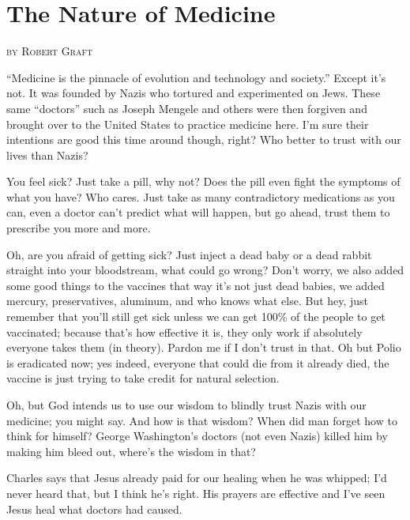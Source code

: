\section{The Nature of Medicine}
\begin{flushright}
\textsc{
by Robert Graft}
\end{flushright}

``Medicine is the pinnacle of evolution and technology and society.'' Except it's not. It was founded by Nazis who tortured and experimented on Jews. These same ``doctors'' such as Joseph Mengele and others were then forgiven and brought over to the United States to practice medicine here. I'm sure their intentions are good this time around though, right? Who better to trust with our lives than Nazis?

You feel sick? Just take a pill, why not? Does the pill even fight the symptoms of what you have? Who cares. Just take as many contradictory medications as you can, even a doctor can't predict what will happen, but go ahead, trust them to prescribe you more and more.

Oh, are you afraid of getting sick? Just inject a dead baby or a dead rabbit straight into your bloodstream, what could go wrong? Don't worry, we also added some good things to the vaccines that way it's not just dead babies, we added mercury, preservatives, aluminum, and who knows what else. But hey, just remember that you'll still get sick unless we can get 100\% of the people to get vaccinated; because that's how effective it is, they only work if absolutely everyone takes them (in theory). Pardon me if I don't trust in that. Oh but Polio is eradicated now; yes indeed, everyone that could die from it already died, the vaccine is just trying to take credit for natural selection.

Oh, but God intends us to use our wisdom to blindly trust Nazis with our medicine; you might say. And how is that wisdom? When did man forget how to think for himself? George Washington's doctors (not even Nazis) killed him by making him bleed out, where's the wisdom in that?

Charles says that Jesus already paid for our healing when he was whipped; I'd never heard that, but I think he's right. His prayers are effective and I've seen Jesus heal what doctors had caused.
